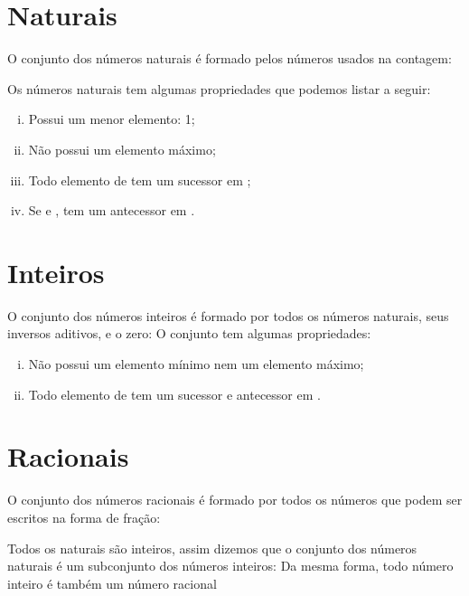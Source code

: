 \documentclass[twocolumn,oneside,a4paper,12pt]{article}
\begin{document}
\maketitle
\FRASE
	

\section*{Naturais}
O conjunto dos números naturais \m{\N} é formado pelos números usados na contagem:


Os números naturais tem algumas propriedades que podemos listar a seguir:
\begin{enumerate}[i.]
\item Possui um menor elemento: 1;
\item Não possui um elemento máximo;
\item Todo elemento de \m{\N} tem um sucessor em \m{\N};
\item Se  e ,  tem um antecessor em \m{\N}.
\end{enumerate}

\section*{Inteiros}
O conjunto dos números inteiros \m{\Z} é formado por todos os números naturais, seus inversos aditivos, e o zero:
O conjunto \m{\Z} tem algumas propriedades:
\begin{enumerate}[i.]
\item Não possui um elemento mínimo nem um elemento máximo;
\item Todo elemento de \m{\Z} tem um sucessor e antecessor em \m{\Z}.
\end{enumerate}

\section*{Racionais}
O conjunto dos números racionais \m{\Q} é formado por todos os números que podem ser escritos na forma de fração:

Todos os naturais são inteiros, assim dizemos que o conjunto dos números naturais é um subconjunto dos números inteiros:
\noindent Da mesma forma, todo número inteiro é também um número racional
\end{document}
